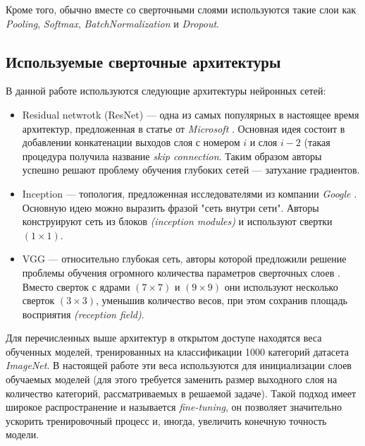 \indent
\indent
Кроме того, обычно вместе со сверточными слоями используются такие 
слои как \textit{Pooling}, \textit{Softmax}, 
\textit{BatchNormalization}\cite{batchnorm}  и \textit{Dropout}\cite{dropout}.


\subsection{Используемые сверточные архитектуры}
\indent
\indent
В данной работе используются следующие архитектуры нейронных сетей:


\begin{itemize}

    \item Residual netwrotk (ResNet) ---
    одна из самых популярных в настоящее время архитектур,
    предложенная в статье от \textit{Microsoft} \cite{resnet}.
    Основная идея состоит в добавлении конкатенации выходов
    слоя с номером  $i$ и слоя $i - 2$ (такая процедура
    получила название \textit{skip connection}. Таким образом авторы
    успешно решают проблему 
    обучения глубоких сетей --- затухание градиентов.
    
    \item {Inception} --- топология, предложенная исследователями 
    из компании \textit{Google} \cite{inception}. Основную идею
    можно выразить фразой "сеть внутри сети". Авторы 
    конструируют сеть из блоков \textit{(inception modules)} и
    используют свертки $(1 \times 1)$.
    
    \item {VGG} --- относительно глубокая сеть, авторы которой предложили
    решение проблемы обучения огромного количества параметров
    сверточных слоев \cite{vgg}. Вместо сверток с ядрами $(7 \times 7)$ и
    $(9 \times 9)$ они используют несколько сверток $(3 \times 3)$, уменьшив
    количество весов, при этом сохранив 
    площадь восприятия \textit{(reception field)}.
    
\end{itemize}

\indent
\indent
Для перечисленных выше архитектур в открытом доступе находятся 
веса обученных моделей, тренированных на классификации 1000
категорий датасета \textit{ImageNet}\cite{imagenet}. В настоящей работе
эти веса используются для инициализации слоев обучаемых моделей
(для этого требуется заменить размер выходного слоя на количество
категорий, рассматриваемых в решаемой задаче).
Такой подход имеет широкое распространение 
и называется \textit{fine-tuning}, он позволяет значительно ускорить
тренировочный процесс и, иногда, увеличить конечную точность модели.

